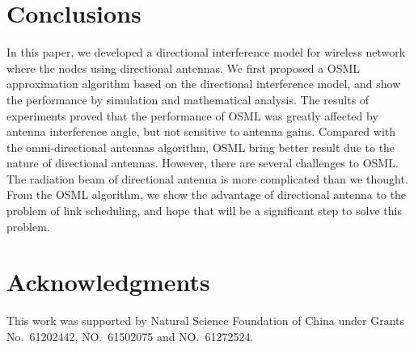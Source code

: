 \documentclass[conference]{IEEEtran}
\begin{document}
\section{Conclusions}

 In this paper, we developed a directional interference model for wireless network where the nodes using directional antennas. We first proposed a OSML approximation algorithm based on the directional interference model, and show the performance by simulation and mathematical analysis. The results of experiments proved that the performance of OSML was greatly affected by antenna interference angle, but not sensitive to antenna gains. Compared with the omni-directional antennas algorithm, OSML bring better result due to the nature of directional antennas. However, there are several challenges to OSML. The radiation beam of directional antenna is more complicated than we thought. From the OSML algorithm, we show the advantage of directional antenna to the problem of link scheduling, and hope that will be a significant step to solve this problem.



\section*{Acknowledgments}
\indent This work was supported by Natural Science Foundation of China under Grants No.~61202442, NO.~61502075 and NO.~61272524.












\end{document}
